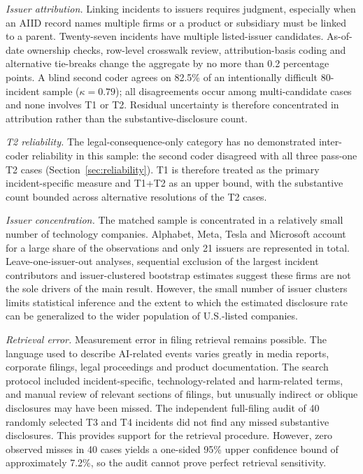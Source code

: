 \documentclass[utf8]{FrontiersinHarvard}
\begin{document}
\textit{Issuer attribution.} Linking incidents to issuers requires judgment, especially when an AIID record names multiple firms or a product or subsidiary must be linked to a parent. Twenty-seven incidents have multiple listed-issuer candidates. As-of-date ownership checks, row-level crosswalk review, attribution-basis coding and alternative tie-breaks change the aggregate by no more than 0.2 percentage points. A blind second coder agrees on 82.5\% of an intentionally difficult 80-incident sample ($\kappa = 0.79$); all disagreements occur among multi-candidate cases and none involves T1 or T2. Residual uncertainty is therefore concentrated in attribution rather than the substantive-disclosure count.

\textit{T2 reliability.} The legal-consequence-only category has no demonstrated inter-coder reliability in this sample: the second coder disagreed with all three pass-one T2 cases (Section~\ref{sec:reliability}). T1 is therefore treated as the primary incident-specific measure and T1+T2 as an upper bound, with the substantive count bounded across alternative resolutions of the T2 cases.

\textit{Issuer concentration.} The matched sample is concentrated in a relatively small number of technology companies. Alphabet, Meta, Tesla and Microsoft account for a large share of the observations and only 21 issuers are represented in total. Leave-one-issuer-out analyses, sequential exclusion of the largest incident contributors and issuer-clustered bootstrap estimates suggest these firms are not the sole drivers of the main result. However, the small number of issuer clusters limits statistical inference and the extent to which the estimated disclosure rate can be generalized to the wider population of U.S.-listed companies.

\textit{Retrieval error.} Measurement error in filing retrieval remains possible. The language used to describe AI-related events varies greatly in media reports, corporate filings, legal proceedings and product documentation. The search protocol included incident-specific, technology-related and harm-related terms, and manual review of relevant sections of filings, but unusually indirect or oblique disclosures may have been missed. The independent full-filing audit of 40 randomly selected T3 and T4 incidents did not find any missed substantive disclosures. This provides support for the retrieval procedure. However, zero observed misses in 40 cases yields a one-sided 95\% upper confidence bound of approximately 7.2\%, so the audit cannot prove perfect retrieval sensitivity.
\end{document}

